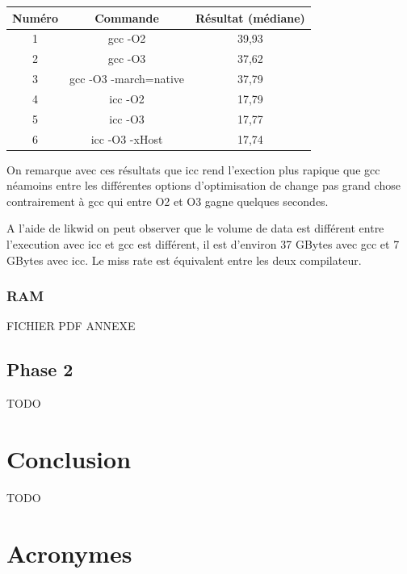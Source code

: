 \documentclass[12pt,a4paper]{article}
\begin{document}
\begin{tabular}{|c|c|c|}
  \hline
	Numéro  & Commande & Résultat (médiane)\\
  \hline
  1 & gcc -O2 & 39,93 \\
    \hline
  2 & gcc -O3 & 37,62 \\
    \hline
  3 & gcc -O3 -march=native & 37,79 \\
    \hline
  4 & icc -O2 & 17,79 \\
    \hline
  5 & icc -O3 & 17,77 \\
    \hline
  6 & icc -O3 -xHost & 17,74 \\
  \hline
\end{tabular}

On remarque avec ces résultats que icc rend l'exection plus rapique que 
gcc néamoins entre les différentes options d'optimisation de change pas 
grand chose contrairement à gcc qui entre O2 et O3 gagne quelques secondes.

A l'aide de likwid on peut observer que le volume de data est différent 
entre l'execution avec icc et gcc est différent, il est d'environ 37 GBytes 
avec gcc et 7 GBytes avec icc. Le miss rate est équivalent entre les deux 
compilateur.



\subsubsection{RAM}

FICHIER PDF ANNEXE

\subsection{Phase 2}

TODO 

\section{Conclusion}

TODO

\newpage
\section*{Acronymes}

\begin{acronym}
\end{acronym}
\end{document}
